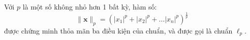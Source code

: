 \newpage Với $p$ {là một số không nhỏ hơn 1} bất kỳ, hàm số:
\begin{equation}
\label{eqn:normp}
\|\mathbf{x}\|_p = (|x_1|^p + |x_2|^p + \dots |x_n|^p)^{\frac{1}{p}}
\end{equation}
được chứng minh thỏa mãn ba điều kiện của chuẩn, và được gọi là {chuẩn $\ell_p$}.
    



